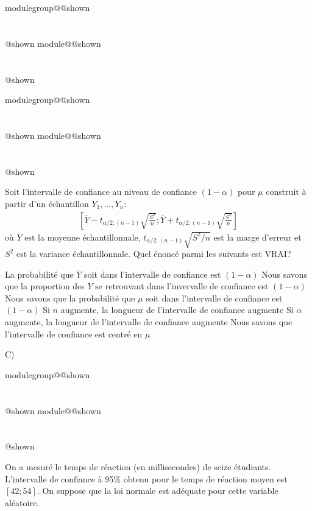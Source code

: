 \documentclass{Evaluation}
\makeatletter
\newcommand{\currentmodulekey}{}
\newcommand{\currentmoduletitle}{}
\newcommand{\currentgroupkey}{}
\newcommand{\currentgrouptitle}{}
\newcommand{\showmoduleifneeded}{%
  \ifx\currentgroupkey\empty\else
    \expandafter\ifx\csname modulegroup@\currentgroupkey @shown\endcsname\relax
      \section*{\currentgrouptitle}%
      \expandafter\gdef\csname modulegroup@\currentgroupkey @shown\endcsname{1}%
    \fi
  \fi
  \expandafter\ifx\csname module@\currentmodulekey @shown\endcsname\relax
    \section*{\currentmoduletitle}%
    \expandafter\gdef\csname module@\currentmodulekey @shown\endcsname{1}%
  \fi
}
\newenvironment{A22}{\showmoduleifneeded}{}
\newenvironment{A25}{\showmoduleifneeded}{}
\newenvironment{H26r}{\showmoduleifneeded}{}
\makeatother
\begin{document}
\begin{questions}
\begin{A25}
\begin{parts}
\begin{solution}
    \end{solution}
\end{parts}

\end{A25}

\begin{A22}
\question {} %

Soit l'intervalle de confiance au niveau de confiance $(1-\alpha)$ pour $\mu$ construit à partir d'un échantillon $Y_1,...,Y_n$:
\begin{align*}
    \left[\overline{Y}- t_{\alpha/2;(n-1)}\sqrt{\frac{S^2}{n}};\overline{Y}+ t_{\alpha/2;(n-1)}\sqrt{\frac{S^2}{n}}\right]
\end{align*}
où $\overline{Y}$ est la moyenne échantillonnale, $t_{\alpha/2;(n-1)}\sqrt{S^2/n}$ est la marge d'erreur et $S^2$ est la variance échantillonnale.
Quel énoncé parmi les suivants est VRAI?

\begin{checkboxes}
    \choice La probabilité que $\overline{Y}$ soit dans l'intervalle de confiance est $(1-\alpha)$
    \choice Nous savons que la proportion des $Y$ se retrouvant dans l'invervalle de confiance est $(1-\alpha)$
    \CorrectChoice Nous savons que la probabilité que $\mu$ soit dans l'intervalle de confiance est $(1-\alpha)$
    \choice Si $n$ augmente, la longueur de l'intervalle de confiance augmente
    \choice Si $\alpha$ augmente, la longueur de l'intervalle de confiance augmente
    \choice Nous savons que l'intervalle de confiance est centré en $\mu$
\end{checkboxes}

\begin{solution}
C)
\end{solution}

\end{A22}

\begin{H26r}
\question {} %
On a mesuré le temps de réaction (en millisecondes) de seize étudiants.
L'intervalle de confiance à 95\% obtenu pour le temps de réaction moyen est $[42; 54]$.
On suppose que la loi normale est adéquate pour cette variable aléatoire.

\end{H26r}
\end{questions}
\end{document}
